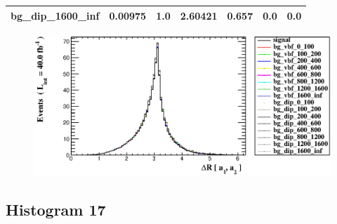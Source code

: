 \documentclass[a4paper, 10pt]{article}
\begin{document}
\begin{table}[H]
\begin{center}
\begin{tabular}{|m{23.0mm}|m{23.0mm}|m{18.0mm}|m{19.0mm}|m{19.0mm}|m{19.0mm}|m{19.0mm}|}
      \hline
      {\cellcolor{white}         bg\_dip\_1600\_inf}& {\cellcolor{white}         0.00975}& {\cellcolor{white}         1.0}& {\cellcolor{white}         2.60421}& {\cellcolor{white}         0.657}& {\cellcolor{green}         0.0}& {\cellcolor{green}         0.0}\\
\hline
    \end{tabular}
  \end{center}
\end{table}

\begin{figure}[H]
  \begin{center}
    \includegraphics[scale=0.45]{selection_15.eps}\\
\caption{   }
  \end{center}
\end{figure}
      \newpage
\subsection{ Histogram 17}
\end{document}

